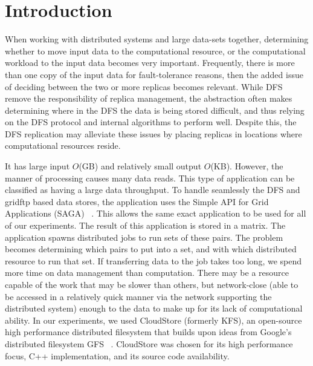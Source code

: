 \documentclass{rspublic}
\begin{document}
\section{Introduction} When working with distributed systems and large
data-sets together, determining whether to move input data to the
computational resource, or the computational workload to the input data
becomes very important. Frequently, there is more than one copy of the
input data for fault-tolerance reasons, then the added issue of deciding
between the two or more replicas becomes relevant. While DFS remove the
responsibility of replica management, the abstraction often makes
determining where in the DFS the data is being stored difficult, and
thus relying on the DFS protocol and internal algorithms to perform
well. Despite this, the DFS replication may alleviate these issues by
placing replicas in locations where computational resources reside.


It has large input $O$(GB) and relatively small output $O$(KB). However,
the manner of processing causes many data reads. This type of
application can be classified as having a large data throughput. To
handle seamlessly the DFS and gridftp based data stores, the application
uses the Simple API for Grid Applications (SAGA) ~\citep{saga_web}. This
allows the same exact application to be used for all of our experiments.
The result of this application is stored in a matrix. The application
spawns distributed jobs to run sets of these pairs.  The problem becomes
determining which pairs to put into a set, and with which distributed
resource to run that set. If transferring data to the job takes too
long, we spend more time on data management than computation. There may
be a resource capable of the work that may be slower than others, but
network-close (able to be accessed in a relatively quick manner via the
network supporting the distributed system) enough to the data to make up
for its lack of computational ability. In our experiments, we used
CloudStore (formerly KFS), an open-source high performance distributed
filesystem that builds upon ideas from Google's distributed filesystem
GFS ~\citep{cloudstore_web}.  CloudStore was chosen for its high performance
focus, C++ implementation, and its source code availability.
\end{document}
